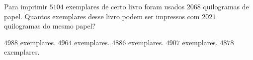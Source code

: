 Para imprimir $5104$ exemplares de certo livro foram usados $2068$ quilogramas de papel. Quantos exemplares desse livro podem ser impressos com $2021$ quilogramas do mesmo papel?

$4988$ exemplares.
$4964$ exemplares.
$4886$ exemplares.
$4907$ exemplares.
$4878$ exemplares.



